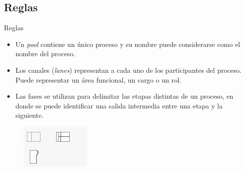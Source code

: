 \subsection{Reglas}

\begin{frame}{Reglas}
    \begin{itemize}
        \item Un \textit{pool} contiene un único proceso y su nombre puede considerarse como el nombre del proceso.
        \item Los canales (\textit{lanes}) representan a cada uno de los participantes del proceso. Puede representar un área funcional, un cargo o un rol.
        \item Las fases se utilizan para delimitar las etapas distintas de un proceso, en donde se puede identificar una salida intermedia entre una etapa y la siguiente.
    \end{itemize}
    \begin{figure}
        \centering
        \includegraphics[scale=0.8]{images/rules.jpg}
    \end{figure}
\end{frame}